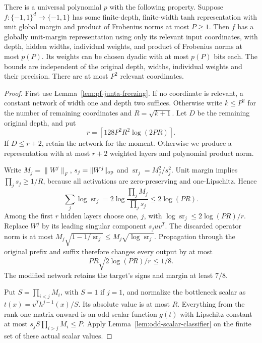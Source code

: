 \begin{theorem}
\label{thm:depth-independent-pf-normal-form}
There is a universal polynomial $p$ with the following property.
Suppose $f:\{-1,1\}^d\to\{-1,1\}$ has some finite-depth,
finite-width tanh representation with unit global margin and product
of Frobenius norms at most $P\ge1$. Then $f$ has a globally
unit-margin representation using only its relevant input coordinates,
with depth, hidden widths, individual weights, and product of
Frobenius norms at most $p(P)$. Its weights can be chosen dyadic
with at most $p(P)$ bits each. The bounds are independent of the
original depth, widths, individual weights and their precision.
There are at most $P^2$ relevant coordinates.
\end{theorem}

\begin{proof}
First use Lemma~\ref{lem:pf-junta-freezing}. If no coordinate is
relevant, a constant network of width one and depth two suffices.
Otherwise write $k\le P^2$ for the number of remaining coordinates
and $R=\sqrt{k+1}$. Let $D$ be the remaining original depth, and put
\[
 r=\left\lceil128P^2R^2\log(2PR)\right\rceil.
\]
If $D\le r+2$, retain the network for the moment. Otherwise we
produce a representation with at most $r+2$ weighted layers and
polynomial product norm.

Write $M_j=\|W^j\|_F$, $s_j=\|W^j\|_{\rm op}$ and
$\operatorname{sr}_j=M_j^2/s_j^2$. Unit margin implies
$\prod_js_j\ge1/R$, because all activations are zero-preserving
and one-Lipschitz. Hence
\[
 \sum_j\log\operatorname{sr}_j
 =2\log\frac{\prod_jM_j}{\prod_js_j}
 \le2\log(PR).
\]
Among the first $r$ hidden layers choose one, $j$, with
$\log\operatorname{sr}_j\le2\log(PR)/r$.
Replace $W^j$ by its leading singular component $s_juv^T$.
The discarded operator norm is at most
$M_j\sqrt{1-1/\operatorname{sr}_j}
 \le M_j\sqrt{\log\operatorname{sr}_j}$.
Propagation through the original prefix and suffix therefore changes
every output by at most
\[
 PR\sqrt{2\log(PR)/r}\le1/8.
\]
The modified network retains the target's signs and margin at least
$7/8$.

Put $S=\prod_{i<j}M_i$, with $S=1$ if $j=1$, and normalize the
bottleneck scalar as $t(x)=v^Th^{j-1}(x)/S$. Its absolute value is at
most $R$. Everything from the rank-one matrix onward is an odd
scalar function $g(t)$ with Lipschitz constant at most
$s_jS\prod_{i>j}M_i\le P$. Apply
Lemma~\ref{lem:odd-scalar-classifier} on the finite set of these
actual scalar values.


\end{proof}

